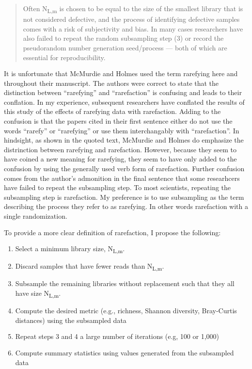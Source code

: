 \documentclass[
]{article}
\providecommand{\tightlist}{%
  \setlength{\itemsep}{0pt}\setlength{\parskip}{0pt}}
\begin{document}
\begin{quote}
Often N\textsubscript{L,m} is chosen to be equal to the size of the
smallest library that is not considered defective, and the process of
identifying defective samples comes with a risk of subjectivity and
bias. In many cases researchers have also failed to repeat the random
subsampling step (3) or record the pseudorandom number generation
seed/process --- both of which are essential for reproducibility.
\end{quote}

It is unfortunate that McMurdie and Holmes used the term rarefying here
and throughout their manuscript. The authors were correct to state that
the distinction between ``rarefying'' and ``rarefaction'' is confusing
and leads to their conflation. In my experience, subsequent researchers
have conflated the results of this study of the effects of rarefying
data with rarefaction. Adding to the confusion is that the papers cited
in their first sentence either do not use the words ``rarefy'' or
``rarefying'' or use them interchangably with ``rarefaction''. In
hindsight, as shown in the quoted text, McMurdie and Holmes do emphasize
the distrinction between rarefying and rarefaction. However, because
they seem to have coined a new meaning for rarefying, they seem to have
only added to the confusion by using the generally used verb form of
rarefaction. Further confusion comes from the author's admonition in the
final sentence that some researhcers have failed to repeat the
subsampling step. To most scientists, repeating the subsampling step is
rarefaction. My preference is to use subsampling as the term describing
the process they refer to as rarefying. In other words rarefaction with
a single randomization.

To provide a more clear definition of rarefaction, I propose the
following:

\begin{enumerate}
\def\labelenumi{\arabic{enumi}.}
\tightlist
\item
  Select a minimum library size, N\textsubscript{L,m}.
\item
  Discard samples that have fewer reads than N\textsubscript{L,m}.
\item
  Subsample the remaining libraries without replacement such that they
  all have size N\textsubscript{L,m}.
\item
  Compute the desired metric (e.g., richness, Shannon diversity,
  Bray-Curtis distances) using the subsampled data
\item
  Repeat steps 3 and 4 a large number of iterations (e.g, 100 or 1,000)
\item
  Compute summary statistics using values generated from the subsampled
  data
\end{enumerate}
\end{document}
